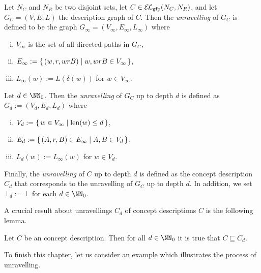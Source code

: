 \begin{Definition}
  \label{def:unravelling-of-EL-description-graphs}
  Let $N_C$ and $N_R$ be two disjoint sets, let $C \in \ELgfp(N_C, N_R)$, and let $G_C =
  (V, E, L)$ the \EL description graph of $C$.  Then the \emph{unravelling} of $G_C$ is
  defined to be the graph $G_\infty = (V_\infty, E_\infty, L_\infty)$ where
  \begin{enumerate}[i. ]
  \item $V_\infty$ is the set of all directed paths in $G_C$,
  \item $E_\infty := {\{\, (w, r, wrB) \mid w, wrB \in V_\infty\,\}}$,
  \item $L_\infty(w) := L(\delta(w))$ for $w \in V_\infty$.
  \end{enumerate}
  Let $d \in \NN_0$.  Then the \emph{unravelling} of $G_C$ up to depth $d$ is defined as
  $G_d := (V_d, E_d, L_d)$ where
  \begin{enumerate}[i. ]
  \item $V_d := {\{\, w \in V_\infty \mid \operatorname{len}(w) \le d \,\}}$,
  \item $E_d := {\{\, (A, r, B) \in E_\infty \mid A, B \in V_d \,\}}$,
  \item $L_d(w) := L_\infty(w)$ for $w \in V_d$.
  \end{enumerate}
  Finally, the \emph{unravelling} of $C$ up to depth $d$ is defined as the \EL concept
  description $C_{d}$ that corresponds to the unravelling of $G_{C}$ up to depth $d$.  In
  addition, we set $\bot_d := \bot$ for each $d \in \NN_0$.
\end{Definition}

A crucial result about unravellings $C_d$ of concept descriptions $C$ is the following
lemma.

\begin{Lemma}
  \label{lem:unravelling-is-more-general}
  Let $C$ be an \ELgfpbot concept description.  Then for all $d \in \NN_0$ it is true that
  $C \sqsubseteq C_d$.
\end{Lemma}

To finish this chapter, let us consider an example which illustrates the process of
unravelling.

